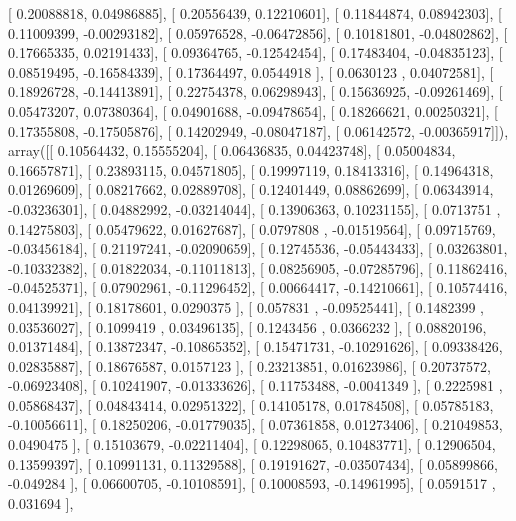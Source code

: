 \documentclass{article}
\begin{document}
       [ 0.20088818,  0.04986885],
       [ 0.20556439,  0.12210601],
       [ 0.11844874,  0.08942303],
       [ 0.11009399, -0.00293182],
       [ 0.05976528, -0.06472856],
       [ 0.10181801, -0.04802862],
       [ 0.17665335,  0.02191433],
       [ 0.09364765, -0.12542454],
       [ 0.17483404, -0.04835123],
       [ 0.08519495, -0.16584339],
       [ 0.17364497,  0.0544918 ],
       [ 0.0630123 ,  0.04072581],
       [ 0.18926728, -0.14413891],
       [ 0.22754378,  0.06298943],
       [ 0.15636925, -0.09261469],
       [ 0.05473207,  0.07380364],
       [ 0.04901688, -0.09478654],
       [ 0.18266621,  0.00250321],
       [ 0.17355808, -0.17505876],
       [ 0.14202949, -0.08047187],
       [ 0.06142572, -0.00365917]]), array([[ 0.10564432,  0.15555204],
       [ 0.06436835,  0.04423748],
       [ 0.05004834,  0.16657871],
       [ 0.23893115,  0.04571805],
       [ 0.19997119,  0.18413316],
       [ 0.14964318,  0.01269609],
       [ 0.08217662,  0.02889708],
       [ 0.12401449,  0.08862699],
       [ 0.06343914, -0.03236301],
       [ 0.04882992, -0.03214044],
       [ 0.13906363,  0.10231155],
       [ 0.0713751 ,  0.14275803],
       [ 0.05479622,  0.01627687],
       [ 0.0797808 , -0.01519564],
       [ 0.09715769, -0.03456184],
       [ 0.21197241, -0.02090659],
       [ 0.12745536, -0.05443433],
       [ 0.03263801, -0.10332382],
       [ 0.01822034, -0.11011813],
       [ 0.08256905, -0.07285796],
       [ 0.11862416, -0.04525371],
       [ 0.07902961, -0.11296452],
       [ 0.00664417, -0.14210661],
       [ 0.10574416,  0.04139921],
       [ 0.18178601,  0.0290375 ],
       [ 0.057831  , -0.09525441],
       [ 0.1482399 ,  0.03536027],
       [ 0.1099419 ,  0.03496135],
       [ 0.1243456 ,  0.0366232 ],
       [ 0.08820196,  0.01371484],
       [ 0.13872347, -0.10865352],
       [ 0.15471731, -0.10291626],
       [ 0.09338426,  0.02835887],
       [ 0.18676587,  0.0157123 ],
       [ 0.23213851,  0.01623986],
       [ 0.20737572, -0.06923408],
       [ 0.10241907, -0.01333626],
       [ 0.11753488, -0.0041349 ],
       [ 0.2225981 ,  0.05868437],
       [ 0.04843414,  0.02951322],
       [ 0.14105178,  0.01784508],
       [ 0.05785183, -0.10056611],
       [ 0.18250206, -0.01779035],
       [ 0.07361858,  0.01273406],
       [ 0.21049853,  0.0490475 ],
       [ 0.15103679, -0.02211404],
       [ 0.12298065,  0.10483771],
       [ 0.12906504,  0.13599397],
       [ 0.10991131,  0.11329588],
       [ 0.19191627, -0.03507434],
       [ 0.05899866, -0.049284  ],
       [ 0.06600705, -0.10108591],
       [ 0.10008593, -0.14961995],
       [ 0.0591517 ,  0.031694  ],
\end{document}

